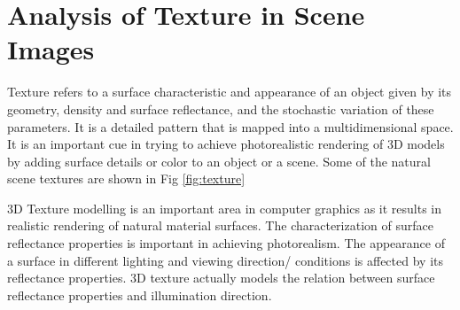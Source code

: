 \label{sec:intro}
\section{Analysis of Texture in Scene Images}

Texture refers to a surface characteristic and appearance of an object given by
its geometry, density and surface reflectance, and the stochastic variation of
these parameters.
It is a detailed pattern that is mapped into a multidimensional space.
It is an important cue in trying to achieve photorealistic
rendering of 3D models by adding surface details or color to an object or a
scene. Some of the natural scene textures are shown in Fig \ref{fig:texture}

3D Texture modelling is an important area in computer graphics as it results in realistic rendering
of natural material surfaces. The characterization of surface reflectance properties is important in
achieving photorealism. The appearance of a surface in different lighting and viewing direction/
conditions is affected by its reflectance properties. 3D texture actually models the relation
between surface reflectance properties and illumination direction.

